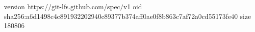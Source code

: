 version https://git-lfs.github.com/spec/v1
oid sha256:a6d1498c4c891932202940c89377b374aff0ae0f8b863c7af72a0cd55173fe40
size 180806
